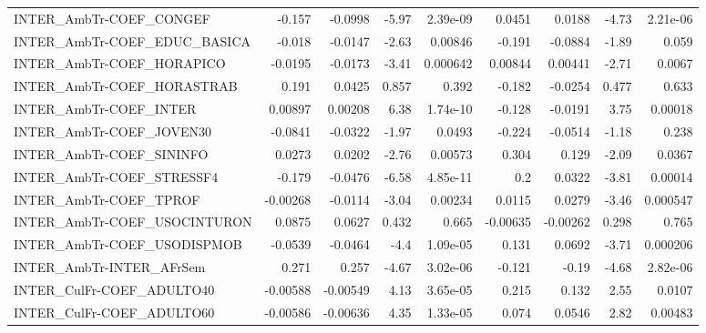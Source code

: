 \begin{tabular}{lrrrrrrrr}
INTER\_AmbTr-COEF\_CONGEF               &      -0.157 &      -0.0998 &   -5.97 & 2.39e-09 &     0.0451 &      0.0188 &        -4.73 &      2.21e-06 \\
INTER\_AmbTr-COEF\_EDUC\_BASICA          &      -0.018 &      -0.0147 &   -2.63 &  0.00846 &     -0.191 &     -0.0884 &        -1.89 &         0.059 \\
INTER\_AmbTr-COEF\_HORAPICO             &     -0.0195 &      -0.0173 &   -3.41 & 0.000642 &    0.00844 &     0.00441 &        -2.71 &        0.0067 \\
INTER\_AmbTr-COEF\_HORASTRAB            &       0.191 &       0.0425 &   0.857 &    0.392 &     -0.182 &     -0.0254 &        0.477 &         0.633 \\
INTER\_AmbTr-COEF\_INTER                &     0.00897 &      0.00208 &    6.38 & 1.74e-10 &     -0.128 &     -0.0191 &         3.75 &       0.00018 \\
INTER\_AmbTr-COEF\_JOVEN30              &     -0.0841 &      -0.0322 &   -1.97 &   0.0493 &     -0.224 &     -0.0514 &        -1.18 &         0.238 \\
INTER\_AmbTr-COEF\_SININFO              &      0.0273 &       0.0202 &   -2.76 &  0.00573 &      0.304 &       0.129 &        -2.09 &        0.0367 \\
INTER\_AmbTr-COEF\_STRESSF4             &      -0.179 &      -0.0476 &   -6.58 & 4.85e-11 &        0.2 &      0.0322 &        -3.81 &       0.00014 \\
INTER\_AmbTr-COEF\_TPROF                &    -0.00268 &      -0.0114 &   -3.04 &  0.00234 &     0.0115 &      0.0279 &        -3.46 &      0.000547 \\
INTER\_AmbTr-COEF\_USOCINTURON          &      0.0875 &       0.0627 &   0.432 &    0.665 &   -0.00635 &    -0.00262 &        0.298 &         0.765 \\
INTER\_AmbTr-COEF\_USODISPMOB           &     -0.0539 &      -0.0464 &    -4.4 & 1.09e-05 &      0.131 &      0.0692 &        -3.71 &      0.000206 \\
INTER\_AmbTr-INTER\_AFrSem              &       0.271 &        0.257 &   -4.67 & 3.02e-06 &     -0.121 &       -0.19 &        -4.68 &      2.82e-06 \\
INTER\_CulFr-COEF\_ADULTO40             &    -0.00588 &     -0.00549 &    4.13 & 3.65e-05 &      0.215 &       0.132 &         2.55 &        0.0107 \\
INTER\_CulFr-COEF\_ADULTO60             &    -0.00586 &     -0.00636 &    4.35 & 1.33e-05 &      0.074 &      0.0546 &         2.82 &       0.00483 \\

\end{tabular}
